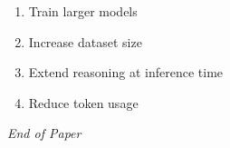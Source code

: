 \documentclass[12pt]{article}
\begin{document}
\begin{enumerate}[label=Q\arabic*.]
\begin{enumerate}[label=(\Alph*)]
    \item Train larger models
    \item Increase dataset size
    \item Extend reasoning at inference time
    \item Reduce token usage
\end{enumerate}
\end{enumerate}

\vfill
\noindent\textit{End of Paper}
\end{document}
